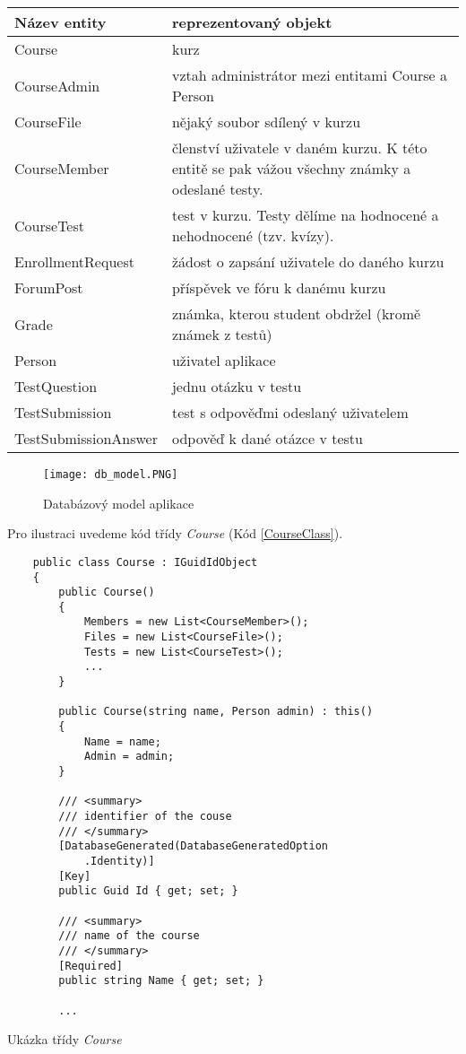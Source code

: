 \begin{table}[ht]
	\centering
	\begin{tabular}{| l | p{9cm} |}
		\hline
		Název entity & reprezentovaný objekt \\
		\hline \hline
		Course & kurz \\ \hline
		CourseAdmin & vztah administrátor mezi entitami Course a Person \\ \hline		
		CourseFile & nějaký soubor sdílený v kurzu \\ \hline
		CourseMember & členství uživatele v daném kurzu. 
		K této entitě se pak vážou všechny známky a odeslané testy. \\ \hline
		CourseTest & test v kurzu. Testy dělíme na hodnocené a nehodnocené (tzv. kvízy). \\ \hline
		EnrollmentRequest & žádost o zapsání uživatele do daného kurzu \\ \hline
		ForumPost & příspěvek ve fóru k danému kurzu \\ \hline
		Grade & známka, kterou student obdržel (kromě známek z testů) \\ \hline
		Person & uživatel aplikace \\ \hline
		TestQuestion & jednu otázku v testu \\ \hline
		TestSubmission & test s odpověďmi odeslaný uživatelem \\ \hline
		TestSubmissionAnswer & odpověď k dané otázce v testu \\
		\hline
	\end{tabular}
\end{table}

\newpage

\begin{figure}
	\centering
	\texttt{[image: db\_model.PNG]}
	\caption{Databázový model aplikace}
	\label{fig:DbModel}
\end{figure}

\newpage

Pro ilustraci uvedeme kód třídy \textit{Course} (Kód \ref{CourseClass}).

\begin{program}
	\begin{lstlisting}
	public class Course : IGuidIdObject
	{
		public Course()
		{
			Members = new List<CourseMember>();
			Files = new List<CourseFile>();
			Tests = new List<CourseTest>();
			...
		}
		
		public Course(string name, Person admin) : this()
		{
			Name = name;
			Admin = admin;
		}
		
		/// <summary>
		/// identifier of the couse
		/// </summary>
		[DatabaseGenerated(DatabaseGeneratedOption
			.Identity)]
		[Key]
		public Guid Id { get; set; }
		
		/// <summary>
		/// name of the course
		/// </summary>
		[Required]
		public string Name { get; set; }
		
		...
	\end{lstlisting}
	\caption{Ukázka třídy \textit{Course}}
	\label{CourseClass}
\end{program}

